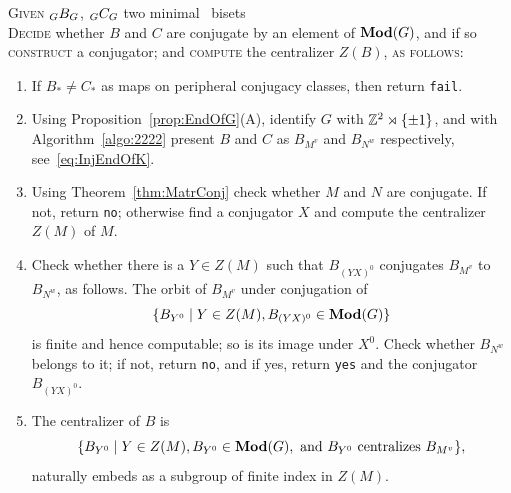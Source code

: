 \documentclass{amsart}
\begin{document}
\begin{algo}\label{algo:minimaltor}
  \textsc{Given} $\subscript G B_G$, $\subscript G C_G$ two minimal \Tor\ bisets\\
  \textsc{Decide} whether $B$ and $C$ are conjugate by an element of $\mathbf{\relax Mod}(G)$, and if so \textsc{construct} a conjugator; and \textsc{compute} the centralizer $Z(B)$, \textsc{as follows:}\\\upshape
  \begin{enumerate}
  \item If $B_*\neq C_*$ as maps on peripheral
    conjugacy classes, then return \texttt{fail}.
  \item Using Proposition~\ref{prop:EndOfG}(A), identify $G$ with
    ${\mathbb Z}^2\rtimes\{\pm1\}$, and with Algorithm~\ref{algo:2222} present
    $B$ and $C$ as $B_{M^v}$ and $B_{N^w}$ respectively, see~\eqref{eq:InjEndOfK}.
  \item Using Theorem~\ref{thm:MatrConj} check whether $M$ and $N$ are
    conjugate. If not, return \texttt{no}; otherwise find a conjugator $X$
    and compute the centralizer $Z(M)$ of $M$.
  \item Check whether there is a $Y\in Z(M)$ such that
    $B_{(Y X)^0}$ conjugates $B_{M^v}$ to $B_{N^w}$, as follows. The orbit of $B_{M^v}$ under conjugation of \[\{B_{Y^0}\mid Y\in Z(M), B_{(Y X)^0}\in \mathbf{\relax Mod}(G)\}\] is finite and hence computable; so is its image under
    $X^0$. Check whether $B_{N^w}$ belongs to it; if not, return
    \texttt{no}, and if yes, return \texttt{yes} and the conjugator
    $B_{(Y X)^0}$.
  \item The centralizer of $B$ is
    \[\{B_{Y^0}\mid Y\in Z(M),B_{Y^0}\in \mathbf{\relax Mod}(G), \text{ and }B_{Y^0}\text{ centralizes }B_{M^v}\},\] naturally embeds as a subgroup of
    finite index in $Z(M)$.
  \end{enumerate}
\end{algo}
\end{document}
